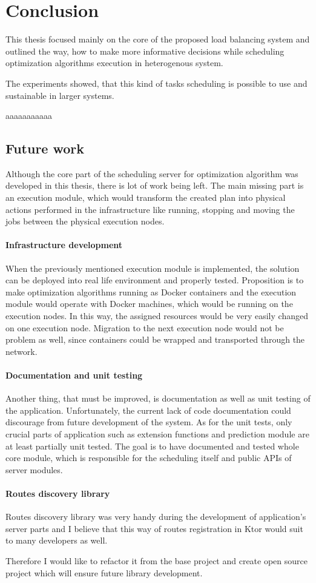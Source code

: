 \chapter{Conclusion}\label{ch:conclusion}
This thesis focused mainly on the core of the proposed load balancing system
and outlined the way,
how to make more informative decisions while scheduling optimization algorithms execution in heterogenous system.

The experiments showed,
that this kind of tasks scheduling is possible to use and sustainable in larger systems.

aaaaaaaaaaa

\section{Future work}\label{sec:future-work}
Although the core part of the scheduling server for optimization algorithm was developed in this thesis,
there is lot of work being left.
The main missing part is an execution module, 
which would transform the created plan into physical actions performed in the infrastructure 
like running, stopping and moving the jobs between the physical execution nodes.

\subsubsection{Infrastructure development}
When the previously mentioned execution module is implemented,
the solution can be deployed into real life environment and properly tested.
Proposition is to make optimization algorithms running as Docker containers 
and the execution module would operate with Docker machines,
which would be running on the execution nodes. 
In this way, 
the assigned resources would be very easily changed on one execution node.
Migration to the next execution node would not be problem as well, 
since containers could be wrapped and transported through the network.

\subsubsection{Documentation and unit testing}
Another thing, that must be improved, is documentation as well as unit testing of the application.
Unfortunately, the current lack of code documentation could discourage from future development of the system.
As for the unit tests, 
only crucial parts of application such as extension functions and prediction module are at least partially unit tested.
The goal is to have documented and tested whole core module,
which is responsible for the scheduling itself and public APIs of server modules. 

\subsubsection{Routes discovery library}
Routes discovery library was very handy during the development of application's server parts 
and I believe that this way of routes registration in Ktor would suit to many developers as well.

Therefore I would like to refactor it from the base project 
and create open source project which will ensure future library development.
